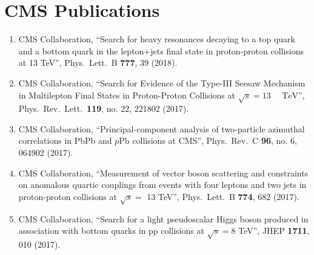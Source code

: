\noindent\makebox[\textwidth]{\rule{\textwidth}{1pt}} 
\section*{CMS Publications}
\begin{enumerate}
\item CMS Collaboration, ``Search for heavy resonances decaying to a top quark and a bottom quark in the lepton+jets final state in proton-proton collisions at 13 TeV'', Phys.\ Lett.\ B {\bf 777}, 39 (2018).

\item CMS Collaboration, ``Search for Evidence of the Type-III Seesaw Mechanism in Multilepton Final States in Proton-Proton Collisions at $\sqrt{s}=13\text{ }\text{ }\mathrm{TeV}$'', Phys.\ Rev.\ Lett.\  {\bf 119}, no. 22, 221802 (2017).

\item CMS Collaboration, ``Principal-component analysis of two-particle azimuthal correlations in PbPb and $p\text{Pb}$ collisions at CMS'', Phys.\ Rev.\ C {\bf 96}, no. 6, 064902 (2017).

\item CMS Collaboration, ``Measurement of vector boson scattering and constraints on anomalous quartic couplings from events with four leptons and two jets in proton-proton collisions at $\sqrt{s}=$ 13 TeV'', Phys.\ Lett.\ B {\bf 774}, 682 (2017).

\item CMS Collaboration, ``Search for a light pseudoscalar Higgs boson produced in association with bottom quarks in pp collisions at $ \sqrt{s}=8 $ TeV'', JHEP {\bf 1711}, 010 (2017).


\end{enumerate}
